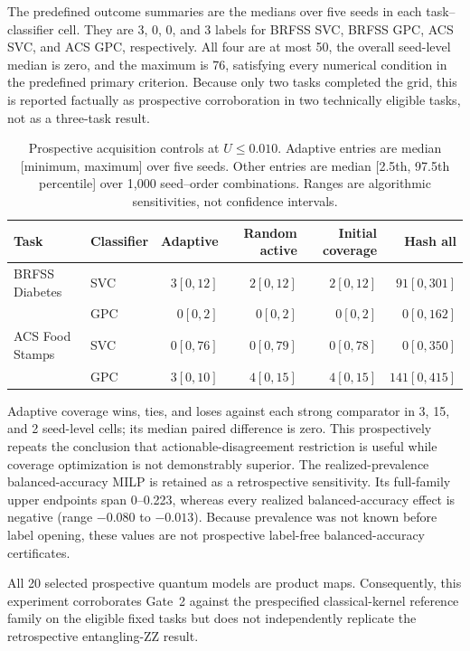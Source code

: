 \documentclass[11pt]{article}
\begin{document}
The predefined outcome summaries are the medians over five seeds in each
task--classifier cell. They are 3, 0, 0, and 3 labels for BRFSS SVC, BRFSS
GPC, ACS SVC, and ACS GPC, respectively. All four are at most 50, the overall
seed-level median is zero, and the maximum is 76, satisfying every numerical
condition in the predefined primary criterion. Because only two tasks
completed the grid, this is reported factually as prospective corroboration
in two technically eligible tasks, not as a three-task result.

\begin{table}[H]
\centering
\caption{Prospective acquisition controls at $U\leq0.010$. Adaptive entries
are median [minimum, maximum] over five seeds. Other entries are median
[2.5th, 97.5th percentile] over 1,000 seed--order combinations. Ranges are
algorithmic sensitivities, not confidence intervals.}
\label{supp:tab_v10_controls}
\scriptsize
\setlength{\tabcolsep}{3.4pt}
\begin{tabular}{llrrrr}
\toprule
Task & Classifier & Adaptive & Random active & Initial coverage & Hash all\\
\midrule
BRFSS Diabetes & SVC & $3[0,12]$ & $2[0,12]$ & $2[0,12]$ & $91[0,301]$\\
                & GPC & $0[0,2]$  & $0[0,2]$  & $0[0,2]$  & $0[0,162]$\\
ACS Food Stamps & SVC & $0[0,76]$ & $0[0,79]$ & $0[0,78]$ & $0[0,350]$\\
                & GPC & $3[0,10]$ & $4[0,15]$ & $4[0,15]$ & $141[0,415]$\\
\bottomrule
\end{tabular}
\end{table}

Adaptive coverage wins, ties, and loses against each strong comparator in 3,
15, and 2 seed-level cells; its median paired difference is zero. This
prospectively repeats the conclusion that actionable-disagreement restriction
is useful while coverage optimization is not demonstrably superior. The
realized-prevalence balanced-accuracy MILP is retained as a retrospective
sensitivity. Its full-family upper endpoints span 0--0.223, whereas every
realized balanced-accuracy effect is negative (range $-0.080$ to $-0.013$).
Because prevalence was not known
before label opening, these values are not prospective label-free
balanced-accuracy certificates.

All 20 selected prospective quantum models are product maps. Consequently,
this experiment corroborates Gate~2 against the prespecified classical-kernel
reference family on the eligible fixed tasks but
does not independently replicate the retrospective entangling-ZZ result.
\end{document}
